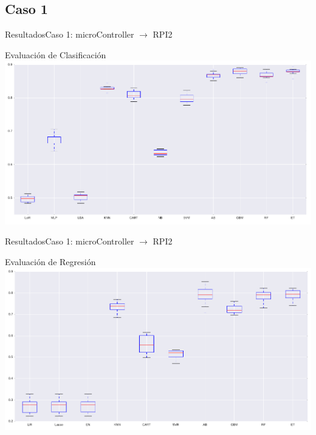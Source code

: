 \documentclass[10pt]{beamer}
\begin{document}
\subsection{Caso 1}
\begin{frame}{Resultados}{Caso 1: microController $\rightarrow$ RPI2}
\begin{block}{Evaluación de Clasificación}
\includegraphics[width=1.0\textwidth]{AAUgraphics/mClass}
\end{block}
\end{frame}
\begin{frame}{Resultados}{Caso 1: microController $\rightarrow$ RPI2}
\begin{block}{Evaluación de Regresión}
\includegraphics[width=1.0\textwidth]{AAUgraphics/mReg}
\end{block}
\end{frame}
\end{document}
